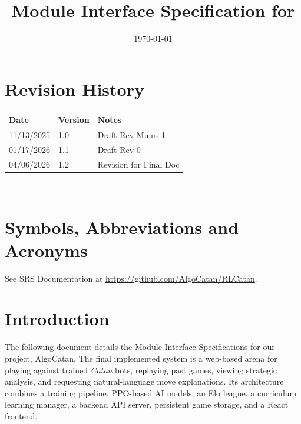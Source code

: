 \documentclass[12pt, titlepage]{article}
\begin{document}
\title{Module Interface Specification for \progname{}}

\author{\authname}

\date{\today}

\maketitle


\section{Revision History}

\begin{tabularx}{\textwidth}{p{3cm}p{2cm}X}
\toprule {\bf Date} & {\bf Version} & {\bf Notes}\\
\midrule
11/13/2025 & 1.0 & Draft Rev Minus 1\\
01/17/2026 & 1.1 & Draft Rev 0\\
04/06/2026 & 1.2 & Revision for Final Doc\\
\bottomrule
\end{tabularx}

~\newpage

\section{Symbols, Abbreviations and Acronyms}

See SRS Documentation at \url{https://github.com/AlgoCatan/RLCatan}.



\newpage

\tableofcontents

\newpage


\section{Introduction}

The following document details the Module Interface Specifications for
our project, AlgoCatan. The final implemented system is a web-based arena for
playing against trained \emph{Catan} bots, replaying past games, viewing
strategic analysis, and requesting natural-language move explanations.
Its architecture combines a training pipeline, PPO-based AI models, an Elo
league, a curriculum learning manager, a backend API server, persistent game
storage, and a React frontend.
\end{document}
